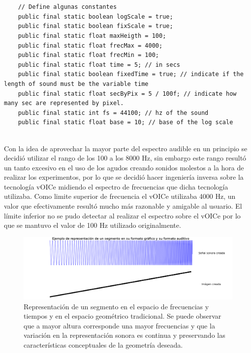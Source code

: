 \documentclass{article}
\begin{document}
    \begin{minipage}{\textwidth}
    \begin{lstlisting}[caption=Constantes y parámetros utilizados en el código que crea transforma la información geométrica en el estímulo sonoro., label=code:Constantes]
    
    
    // Define algunas constantes
	public final static boolean logScale = true;
	public final static boolean fixScale = true;
	public final static float maxHeigth = 100;
	public final static float frecMax = 4000;
	public final static float frecMin = 100;
	public final static float time = 5; // in secs
	public final static boolean fixedTime = true; // indicate if the length of sound must be the variable time
	public final static float secByPix = 5 / 100f; // indicate how many sec are represented by pixel.
	public final static int fs = 44100; // hz of the sound
	public final static float base = 10; // base of the log scale
    
    \end{lstlisting}
    \end{minipage}
    
    Con la idea de aprovechar la mayor parte del espectro audible en un principio se decidió utilizar el rango de los 100 a los 8000 Hz, sin embargo este rango resultó un tanto excesivo en el uso de los agudos creando sonidos molestos a la hora de realizar los experimentos, por lo que se decidió hacer ingeniería inversa sobre la tecnología vOICe midiendo el espectro de frecuencias que dicha tecnología utilizaba. Como limite superior de frecuencia el vOICe utilizaba 4000 Hz, un valor que efectivamente resultó mucho más razonable y amigable al usuario. El límite inferior no se pudo detectar al realizar el espectro sobre el vOICe por lo que se mantuvo el valor de 100 Hz utilizado originalmente. 
    
    \begin{figure}
        \center
        \includegraphics[width=\textwidth]{Imagenes/rampaFrec.png}
        \caption{Representación de un segmento en el espacio de frecuencias y tiempos y en el espacio geométrico tradicional. Se puede observar que a mayor altura corresponde una mayor frecuencias y que la variación en la representación sonora es continua y preservando las características conceptuales de la geometría deseada.}
        \label{fig:rampaFrec}
    \end{figure}
    
\end{document}
